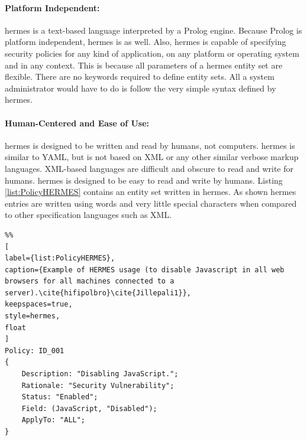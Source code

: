 \documentclass[12pt,letterpaper]{report}
\begin{document}
\paragraph{Platform Independent:} \ac{hermes} is a text-based language interpreted by a Prolog engine. Because Prolog is platform independent, \ac{hermes} is as well. Also, \ac{hermes} is capable of specifying security policies for any kind of application, on any platform or operating system and in any context. This is because all parameters of a \ac{hermes} entity set are flexible. There are no keywords required to define entity sets. All a system administrator would have to do is follow the very simple syntax defined by \ac{hermes}. 


\paragraph{Human-Centered and Ease of Use:} \ac{hermes} is designed to be written and read by humans, not computers. \ac{hermes} is similar to YAML, but is not based on XML or any other similar verbose markup languages. XML-based languages are difficult and obscure to read and write for humans. \ac{hermes} is designed to be easy to read and write by humans. Listing \ref{list:PolicyHERMES} contains an entity set written in \ac{hermes}. As shown \ac{hermes} entries are written using words and very little special characters when compared to other specification languages such as XML.

\begin{lstlisting}%%
[
label={list:PolicyHERMES}, 
caption={Example of HERMES usage (to disable Javascript in all web browsers for all machines connected to a server).\cite{hifipolbro}\cite{Jillepali1}}, 
keepspaces=true,
style=hermes,
float
]
Policy: ID_001
{
	Description: "Disabling JavaScript.";
	Rationale: "Security Vulnerability";
	Status: "Enabled";
	Field: (JavaScript, "Disabled");
	ApplyTo: "ALL";
}
\end{lstlisting}
\end{document}
